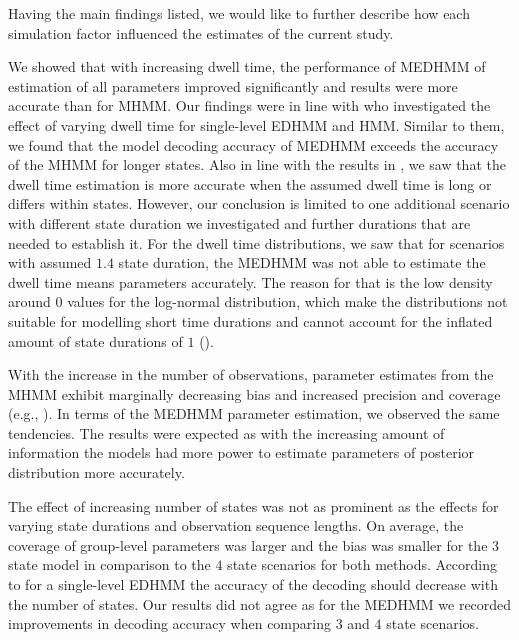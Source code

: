 Having the main findings listed, we would like to further describe how each simulation factor influenced the estimates of the current study. 

We showed that with increasing dwell time, the performance of MEDHMM of estimation of all parameters improved significantly and results were more accurate than for MHMM. Our findings were in line with \cite{Ruiz_Suarez_2022} who investigated the effect of varying dwell time for single-level EDHMM and HMM. Similar to them, we found that the model decoding accuracy of MEDHMM exceeds the accuracy of the MHMM for longer states. Also in line with the results in \cite{Ruiz_Suarez_2022}, we saw that the dwell time estimation is more accurate when the assumed dwell time is long or differs within states. However, our conclusion is limited to one additional scenario with different state duration we investigated and further durations that are needed to establish it. For the dwell time distributions, we saw that for scenarios with assumed $1.4$ state duration, the MEDHMM was not able to estimate the dwell time means parameters accurately. The reason for that is the low density around $0$ values for the log-normal distribution, which make the distributions not suitable for modelling short time durations and cannot account for the inflated amount of state durations of $1$ (\citealp{hadjamar2022bayesian}). 

With the increase in the number of observations, parameter estimates from the MHMM exhibit marginally decreasing bias and increased precision and coverage (e.g., \citealp{McClintock_2021}). In terms of the MEDHMM parameter estimation, we observed the same tendencies. The results were expected as with the increasing amount of information the models had more power to estimate parameters of posterior distribution more accurately.  

The effect of increasing number of states was not as prominent as the effects for varying state durations and observation sequence lengths. On average, the coverage of group-level parameters was larger and the bias was smaller for the $3$ state model in comparison to the $4$ state scenarios for both methods. According to \cite{LUATI2021107183} for a single-level EDHMM the accuracy of the decoding should decrease with the number of states. Our results did not agree as for the MEDHMM we recorded improvements in decoding accuracy when comparing $3$ and $4$ state scenarios. 

